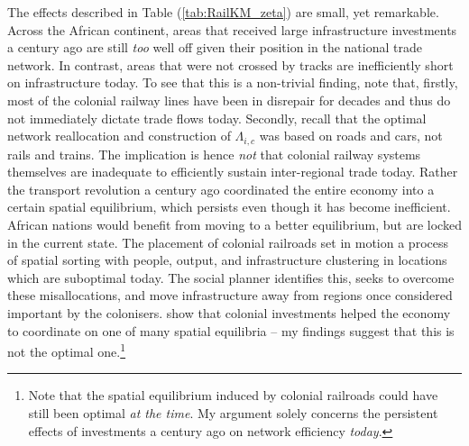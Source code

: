 \documentclass[11pt, oneside]{article}   	%
\let\oldref\ref
\renewcommand{\ref}[1]{(\oldref{#1})}
\begin{document}
The effects described in Table \ref{tab:RailKM_zeta} are small, yet remarkable. Across the African continent, areas that received large infrastructure investments a century ago are still \emph{too} well off given their position in the national trade network. In contrast, areas that were not crossed by tracks are inefficiently short on infrastructure today. To see that this is a non-trivial finding, note that, firstly, most of the colonial railway lines have been in disrepair for decades and thus do not immediately dictate trade flows today. Secondly, recall that the optimal network reallocation and construction of $\Lambda_{i,c}$ was based on roads and cars, not rails and trains. The implication is hence \emph{not} that colonial railway systems themselves are inadequate to efficiently sustain inter-regional trade today. Rather the transport revolution a century ago coordinated the entire economy into a certain spatial equilibrium, which persists even though it has become inefficient. African nations would benefit from moving to a better equilibrium, but are locked in the current state. The placement of colonial railroads set in motion a process of spatial sorting with people, output, and infrastructure clustering in locations which are suboptimal today. The social planner identifies this, seeks to overcome these misallocations, and move infrastructure away from regions once considered important by the colonisers. \citeauthor{jedwab_permanent_2016} show that colonial investments helped the economy to coordinate on one of many spatial equilibria -- my findings suggest that this is not the optimal one.\footnote{Note that the spatial equilibrium induced by colonial railroads could have still been optimal \emph{at the time}. My argument solely concerns the persistent effects of investments a century ago on network efficiency \emph{today}.}
\end{document}
